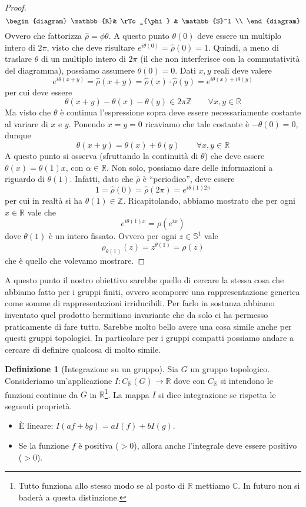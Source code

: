 \documentclass[11pt]{article}
\theoremstyle{plain}
\theoremstyle{definition}
\newtheorem{defn}{Definizione}[section]
\theoremstyle{remark}
\newcommand{\C}{\mathbb{C}}
\newcommand{\R}{\mathbb{R}}
\newcommand{\Z}{\mathbb{Z}}
\begin{document}
\begin{proof}
\[\begin{diagram}
    \R          &  \rTo_{\phi}          & \mathbb{S}^1           \\
  \end{diagram}
  \]
Ovvero che fattorizza $\hat\rho=\phi\theta$. A questo punto $\theta(0)$ deve essere un multiplo intero di $2\pi$, visto che deve risultare $e^{i\theta(0)} = \hat\rho(0) = 1$.
Quindi, a meno di traslare $\theta$ di un multiplo intero di $2\pi$ (il che non interferisce con la commutatività del diagramma), possiamo assumere $\theta(0) = 0$. Dati $x,y$ reali deve valere
\[ e^{i\theta(x+y)} = \hat \rho(x+y) = \hat \rho(x )\cdot \hat \rho(y) = e^{i\theta(x)+i \theta(y)}\]
per cui deve essere
\[ \theta(x+y) - \theta(x) - \theta(y) \in 2\pi \Z \qquad \forall x, y \in \R \]
Ma visto che $\theta$ è continua l'espressione sopra deve essere necessariamente costante al variare di $x$ e $y$. Ponendo $x=y=0$ ricaviamo che tale costante è $-\theta(0)=0$, dunque
\[ \theta(x + y) = \theta(x ) + \theta (y) \qquad \forall x,y\in \R\]
A questo punto si osserva (sfruttando la continuità di $\theta$) che deve essere $\theta(x) = \theta(1) x$, con $\alpha \in \R$. Non solo, possiamo dare delle informazioni a riguardo di $\theta(1)$. Infatti, dato che $\hat\rho$ è ``periodico'', deve essere
\[ 1 = \hat\rho(0) = \hat\rho(2\pi) = e^{i\theta(1) 2\pi}\]
per cui in realtà si ha $\theta(1) \in \Z$.
Ricapitolando, abbiamo mostrato che per ogni $x\in\R$ vale che
\[e^{i \theta(1)x} = \rho(e^{ix}) \]
dove $\theta(1)$ è un intero fissato. Ovvero per ogni $z\in\mathbb{S}^1$ vale
\[ \rho_{\theta(1)}(z) = z^{\theta(1)} = \rho(z) \]
che è quello che volevamo mostrare.

\end{proof}

A questo punto il nostro obiettivo sarebbe quello di cercare la stessa cosa che abbiamo fatto per i gruppi finiti, ovvero scomporre una rappresentazione generica come somme di rappresentazioni irriducibili. Per farlo in sostanza abbiamo inventato quel prodotto hermitiano invariante che da solo ci ha permesso praticamente di fare tutto. Sarebbe molto bello avere una cosa simile anche per questi gruppi topologici. In particolare per i gruppi compatti possiamo andare a cercare di definire qualcosa di molto simile.


\begin{defn}[Integrazione su un gruppo]
Sia $G$ un gruppo topologico. Consideriamo un'applicazione $I: C_{\R}(G) \to \R$
dove con $C_\R$ si intendono le funzioni continue da $G$ in $\R$\footnote{Tutto funziona allo stesso modo se al posto di $\R$ mettiamo $\C$. In futuro non si baderà a questa distinzione.}. La mappa $I$ si dice integrazione se rispetta le seguenti proprietà.
\begin{itemize}
\item \`E lineare: $I(a f + b g) = aI(f) + bI(g)$.
\item Se la funzione $f$ è positiva ($ > 0$), allora anche l'integrale deve essere positivo ($> 0$).
\end{itemize}
\end{defn}
\end{document}

